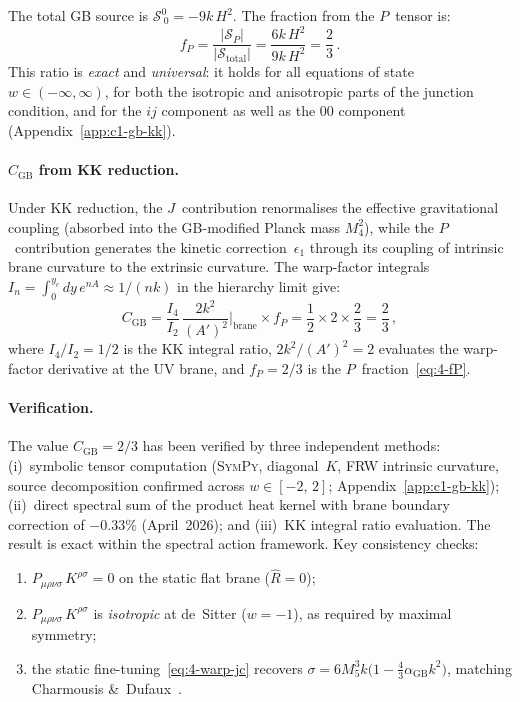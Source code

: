 The total GB source is $\mathcal{S}^0_{\ 0} = -9k\, H^2$. The fraction from the $P$~tensor is:
\begin{equation}
  f_P = \frac{|\mathcal{S}_P|}{|\mathcal{S}_{\mathrm{total}}|}
  = \frac{6k\, H^2}{9k\, H^2} = \frac{2}{3}\,.
  \label{eq:4-fP}
\end{equation}
This ratio is \emph{exact} and \emph{universal}: it holds for all equations of state $w \in (-\infty, \infty)$, for both the isotropic and anisotropic parts of the junction condition, and for the $ij$ component as well as the $00$ component (Appendix~\ref{app:c1-gb-kk}).

\paragraph{$C_{\mathrm{GB}}$ from KK reduction.}
Under KK reduction, the $J$~contribution renormalises the effective gravitational coupling (absorbed into the GB-modified Planck mass $M_4^2$), while the $P$~contribution generates the kinetic correction~$\epsilon_1$ through its coupling of intrinsic brane curvature to the extrinsic curvature. The warp-factor integrals $I_n = \int_0^{y_c} dy\, e^{nA} \approx 1/(nk)$ in the hierarchy limit give:
\begin{equation}
  C_{\mathrm{GB}} = \frac{I_4}{I_2}\,\frac{2k^2}{(A')^2}\bigg|_{\mathrm{brane}} \times f_P
  = \frac{1}{2} \times 2 \times \frac{2}{3} = \frac{2}{3}\,,
  \label{eq:4-cgb-result}
\end{equation}
where $I_4/I_2 = 1/2$ is the KK integral ratio, $2k^2/(A')^2 = 2$ evaluates the warp-factor derivative at the UV brane, and $f_P = 2/3$ is the $P$~fraction~\eqref{eq:4-fP}.

\paragraph{Verification.}
The value $C_{\mathrm{GB}} = 2/3$ has been verified by three independent methods: (i)~symbolic tensor computation (\textsc{SymPy}, diagonal~$K$, FRW intrinsic curvature, source decomposition confirmed across $w \in [-2,\, 2]$; Appendix~\ref{app:c1-gb-kk}); (ii)~direct spectral sum of the product heat kernel with brane boundary correction of $-0.33\%$ (April~2026); and (iii)~KK integral ratio evaluation. The result is exact within the spectral action framework. Key consistency checks:
\begin{enumerate}
  \item $P_{\mu\rho\nu\sigma}\, K^{\rho\sigma} = 0$ on the static flat brane ($\hat{R} = 0$);
  \item $P_{\mu\rho\nu\sigma}\, K^{\rho\sigma}$ is \emph{isotropic} at de~Sitter ($w = -1$), as required by maximal symmetry;
  \item the static fine-tuning~\eqref{eq:4-warp-jc} recovers $\sigma = 6M_5^3 k\bigl(1 - \tfrac{4}{3}\alpha_{\mathrm{GB}} k^2\bigr)$, matching Charmousis \&\ Dufaux~\cite{ch4:Charmousis2002}.
\end{enumerate}


